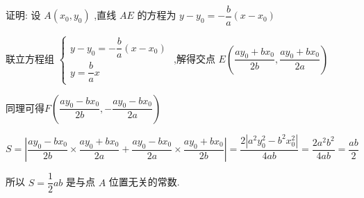 \begin{enumerate}
\begin{jieda}
        证明: 设 $A\left( {{x}_{0},{y}_{0}}\right)$ ,直线 ${AE}$ 的方程为 $y - {y}_{0} =  - \dfrac{b}{a}\left( {x - {x}_{0}}\right)$ 
        
        联立方程组 $\left\{  \begin{array}{l} y - {y}_{0} =  - \dfrac{b}{a}\left( {x - {x}_{0}}\right) \\  y = \dfrac{b}{a}x \end{array}\right.$ ,解得交点 $E\left( {\dfrac{a{y}_{0} + b{x}_{0}}{2b},\dfrac{a{y}_{0} + b{x}_{0}}{2a}}\right)$ 
        
        同理可得$F\left( {\dfrac{a{y}_{0} - b{x}_{0}}{2b}, -\dfrac{a{y}_{0} - b{x}_{0}}{2a}}\right)$

        $S = \left|\dfrac{a{y}_{0} - b{x}_{0}}{2b} \times \dfrac{a{y}_{0} + b{x}_{0}}{2a} + \dfrac{a{y}_{0} - b{x}_{0}}{2a} \times \dfrac{a{y}_{0} + b{x}_{0}}{2b}\right| = \dfrac{2|a^2y_0^2-b^2x_0^2|}{4ab} = \dfrac{2a^2b^2}{4ab} = \dfrac{ab}{2}$
        
        所以 $S = \dfrac{1}{2}a{b}$ 是与点 $A$ 位置无关的常数.
    \end{jieda}

\end{enumerate}

\clearpage
